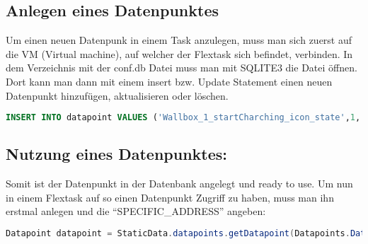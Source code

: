 \subsection{Anlegen eines Datenpunktes}


Um einen neuen Datenpunk in einem Task anzulegen, muss man sich zuerst auf die VM (Virtual machine),  auf welcher der Flextask sich befindet, verbinden. In dem Verzeichnis mit der conf.db Datei muss man mit SQLITE3 die Datei öffnen. Dort kann man dann mit einem insert bzw. Update Statement einen neuen Datenpunkt hinzufügen, aktualisieren oder löschen. 

\begin{lstlisting}[language=sql,caption=Example Element,label=lst:impl:foo]
    INSERT INTO datapoint VALUES ('Wallbox_1_startCharching_icon_state',1,'' ,'state_[Wallbox_1_startCharching_icon]','','','INT',-1,-1,0.0,'');
\end{lstlisting}

\subsection{Nutzung eines Datenpunktes:}

Somit ist der Datenpunkt in der Datenbank angelegt und ready to use. Um nun in einem Flextask auf so einen Datenpunkt Zugriff zu haben, muss man ihn erstmal anlegen und die “SPECIFIC\_ADDRESS” angeben: 

\begin{lstlisting}[language=java,caption=Example Datapoint,label=lst:impl:foo]
    Datapoint datapoint = StaticData.datapoints.getDatapoint(Datapoints.DatapointField.SPECIFIC_ADDRESS, "SPECIFIC_ADDRESS_DES_DATENPUNKTES"); 
\end{lstlisting}

